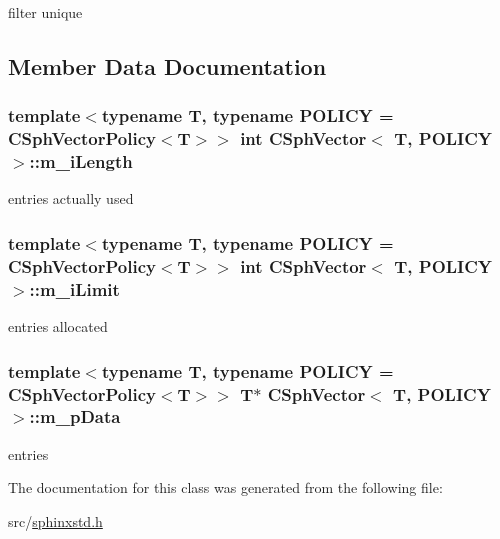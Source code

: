 filter unique 



\subsection{Member Data Documentation}
\hypertarget{classCSphVector_a53e89bf68104247f5092014e6eb4bbec}{
\subsubsection[{m\-\_\-i\-Length}]{\setlength{\rightskip}{0pt plus 5cm}template$<$typename T, typename P\-O\-L\-I\-C\-Y = C\-Sph\-Vector\-Policy$<$\-T$>$$>$ {\bf int} {\bf C\-Sph\-Vector}$<$ T, P\-O\-L\-I\-C\-Y $>$\-::m\-\_\-i\-Length\hspace{0.3cm}{\ttfamily [protected]}}}\label{classCSphVector_a53e89bf68104247f5092014e6eb4bbec}


entries actually used 

\hypertarget{classCSphVector_a7a44e1ebfb86dfd56bb8b48873ed5bde}{
\subsubsection[{m\-\_\-i\-Limit}]{\setlength{\rightskip}{0pt plus 5cm}template$<$typename T, typename P\-O\-L\-I\-C\-Y = C\-Sph\-Vector\-Policy$<$\-T$>$$>$ {\bf int} {\bf C\-Sph\-Vector}$<$ T, P\-O\-L\-I\-C\-Y $>$\-::m\-\_\-i\-Limit\hspace{0.3cm}{\ttfamily [protected]}}}\label{classCSphVector_a7a44e1ebfb86dfd56bb8b48873ed5bde}


entries allocated 

\hypertarget{classCSphVector_aaaab95f327bf975e636a80077b22cfaf}{
\subsubsection[{m\-\_\-p\-Data}]{\setlength{\rightskip}{0pt plus 5cm}template$<$typename T, typename P\-O\-L\-I\-C\-Y = C\-Sph\-Vector\-Policy$<$\-T$>$$>$ T$\ast$ {\bf C\-Sph\-Vector}$<$ T, P\-O\-L\-I\-C\-Y $>$\-::m\-\_\-p\-Data\hspace{0.3cm}{\ttfamily [protected]}}}\label{classCSphVector_aaaab95f327bf975e636a80077b22cfaf}


entries 



The documentation for this class was generated from the following file\-:\begin{DoxyCompactItemize}
\item 
src/\hyperlink{sphinxstd_8h}{sphinxstd.\-h}\end{DoxyCompactItemize}
